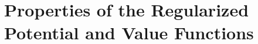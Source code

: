 \section{Properties of the Regularized Potential and Value Functions}
\label{app:fast-lralm-value-functions}

%
%

